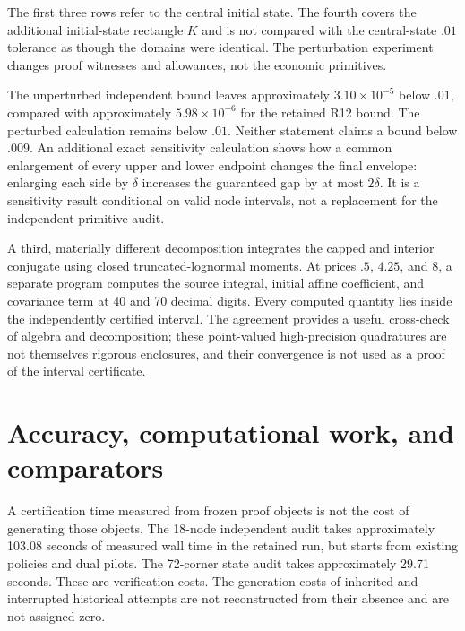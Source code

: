 \begin{table}[t]\centering\small
\caption{Continuum certificates under independent verification and perturbation}\label{tab:robustness}

\par\smallskip\footnotesize The first three rows refer to the central initial state. The fourth covers the additional initial-state rectangle $K$ and is not compared with the central-state $.01$ tolerance as though the domains were identical. The perturbation experiment changes proof witnesses and allowances, not the economic primitives.
\end{table}

The unperturbed independent bound leaves approximately $3.10\times10^{-5}$ below $.01$, compared with approximately $5.98\times10^{-6}$ for the retained R12 bound. The perturbed calculation remains below $.01$. Neither statement claims a bound below $.009$. An additional exact sensitivity calculation shows how a common enlargement of every upper and lower endpoint changes the final envelope: enlarging each side by $\delta$ increases the guaranteed gap by at most $2\delta$. It is a sensitivity result conditional on valid node intervals, not a replacement for the independent primitive audit.

A third, materially different decomposition integrates the capped and interior conjugate using closed truncated-lognormal moments. At prices $.5$, $4.25$, and $8$, a separate program computes the source integral, initial affine coefficient, and covariance term at 40 and 70 decimal digits. Every computed quantity lies inside the independently certified interval. The agreement provides a useful cross-check of algebra and decomposition; these point-valued high-precision quadratures are not themselves rigorous enclosures, and their convergence is not used as a proof of the interval certificate.

\section{Accuracy, computational work, and comparators}\label{sec:comparison}
A certification time measured from frozen proof objects is not the cost of generating those objects. The 18-node independent audit takes approximately 103.08 seconds of measured wall time in the retained run, but starts from existing policies and dual pilots. The 72-corner state audit takes approximately 29.71 seconds. These are verification costs. The generation costs of inherited and interrupted historical attempts are not reconstructed from their absence and are not assigned zero.

